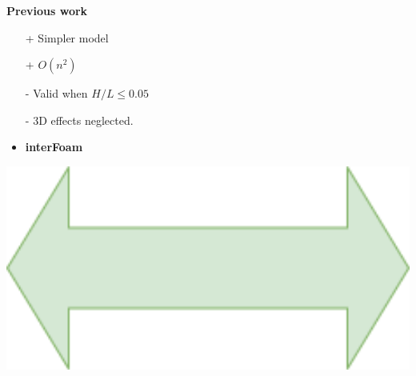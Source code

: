 
\begin{frame}
{\Large \textbf{Previous work \cite{mintgen}}}\\[0.5cm]
\hspace{1cm}
\begin{minipage}{0.35\textwidth}
\begin{tcolorbox}[
colframe=TUMDarkBlue,
colback=TUMDarkBlue!50,
title = \centering SWE\\2D] 
\begin{itemize}
\item[+] Simpler model 
\item[+] $O(n^2)$
\item[-] Valid when $H/L \leq 0.05$ %
\item[-] 3D effects neglected. \vspace{0.5cm}
\item<2-> \large \textbf{interFoam}
\end{itemize}
\end{tcolorbox}    
\end{minipage}
\begin{minipage}{0.15\textwidth}
\hspace{0.5cm}
\includegraphics[width=1\textwidth]{Resources/Images/arrow2.png}\\
\end{minipage}
\begin{minipage}{0.35\textwidth}

\end{minipage}
\end{frame}
